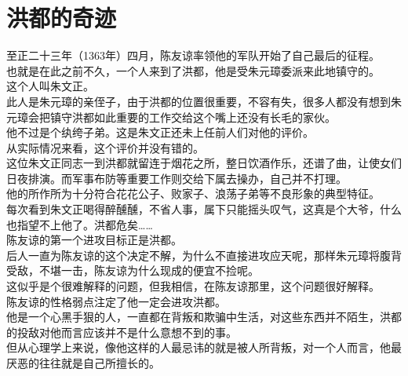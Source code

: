 \section{洪都的奇迹}
\ifnum{}
	\begin{multicols}{\theparacolNo}
\fi
至正二十三年（1363年）四月，陈友谅率领他的军队开始了自己最后的征程。\\

也就是在此之前不久，一个人来到了洪都，他是受朱元璋委派来此地镇守的。\\

这个人叫朱文正。\\

此人是朱元璋的亲侄子，由于洪都的位置很重要，不容有失，很多人都没有想到朱元璋会把镇守洪都如此重要的工作交给这个嘴上还没有长毛的家伙。\\

他不过是个纨绔子弟。这是朱文正还未上任前人们对他的评价。\\

从实际情况来看，这个评价并没有错的。\\

这位朱文正同志一到洪都就留连于烟花之所，整日饮酒作乐，还谱了曲，让使女们日夜排演。而军事布防等重要工作则交给下属去操办，自己并不打理。\\

他的所作所为十分符合花花公子、败家子、浪荡子弟等不良形象的典型特征。\\

每次看到朱文正喝得醉醺醺，不省人事，属下只能摇头叹气，这真是个大爷，什么也指望不上他了。洪都危矣……\\

陈友谅的第一个进攻目标正是洪都。\\

后人一直为陈友谅的这个决定不解，为什么不直接进攻应天呢，那样朱元璋将腹背受敌，不堪一击，陈友谅为什么现成的便宜不捡呢。\\

这似乎是个很难解释的问题，但我相信，在陈友谅那里，这个问题很好解释。\\

陈友谅的性格弱点注定了他一定会进攻洪都。\\

他是一个心黑手狠的人，一直都在背叛和欺骗中生活，对这些东西并不陌生，洪都的投敌对他而言应该并不是什么意想不到的事。\\

但从心理学上来说，像他这样的人最忌讳的就是被人所背叛，对一个人而言，他最厌恶的往往就是自己所擅长的。\\


\end{multicols}
